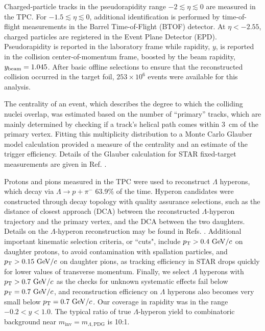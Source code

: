\documentclass[
  reprint,
  superscriptaddress,
  amsmath,
  amssymb,
  aps,
  floatfix,
]{revtex4-2}
\newcommand{\proton}{p}
\newcommand{\pion}{\pi^{-}}
\newcommand{\pT}{p_\mathrm{T}}
\newcommand{\InvMass}{m_\mathrm{inv}}
\newcommand{\LambdaPdgMass}{m_{\Lambda, \mathrm{PDG}}}
\begin{document}
Charged-particle tracks in the pseudorapidity range $-2\lesssim\eta\lesssim0$
 are measured in the TPC\cite{Anderson:2003ur}. For
 $-1.5\lesssim\eta\lesssim0$, additional identification is performed by
 time-of-flight measurements in the Barrel Time-of-Flight
 (BTOF) detector\cite{Llope:2012zz,Shao:2005iu}. At
 $\eta<-2.55$, charged particles are registered
 in the Event Plane Detector (EPD)\cite{Adams:2019fpo}.
 Pseudorapidity is reported 
 in the laboratory frame while rapidity, $y$, is reported in the
 collision center-of-momentum frame, boosted by the
 beam rapidity, $y_{\rm beam}=1.045$.
 After basic offline selections
 to ensure that the reconstructed collision
 occurred in the target foil, $253\times10^6$
 events were available for this analysis.

The centrality of an event, which
 describes the degree to which the
 colliding nuclei overlap, was estimated based
 on the number of ``primary'' tracks,
 which are mainly determined by checking
 if a track's helical path comes
 within 3~cm of the primary vertex.
 Fitting this multiplicity distribution to a
 Monte Carlo Glauber model\cite{Ray:2007av} calculation provided a
 measure of the centrality and an
 estimate of the trigger efficiency. Details
 of the Glauber calculation for STAR
 fixed-target measurements are given in Ref. \cite{STAR:2020dav}.

Protons and pions measured in the
 TPC were used to reconstruct $\Lambda$
 hyperons, which decay via $\Lambda\rightarrow \proton+\pion$
 63.9\% of the time\cite{Zyla:2020zbs}.  Hyperon
 candidates were constructed through decay topology
 with quality assurance selections, such as
 the distance of closest approach (DCA)
 between the reconstructed $\Lambda$-hyperon trajectory and
 the primary vertex, and the DCA
 between the two daughters.  Details
 on the $\Lambda$-hyperon reconstruction may be
 found in Refs. \cite{Adam:2018ivw,GorbunovThesis,MaksymThesis}.  Additional important kinematic
 selection criteria, or ``cuts", include $\pT>0.4~{\rm GeV}/c$ on daughter protons, to avoid
 contamination with spallation particles, and $\pT>0.15~{\rm GeV}/c$ on daughter pions, as tracking
 efficiency in STAR drops quickly for
 lower values of transverse momentum. 
 Finally, we select $\Lambda$ hyperons with
 $\pT>0.7~{\rm GeV}/c$ as the checks for
 unknown systematic effects fail below $\pT=0.7~{\rm GeV}/c$,
 and reconstruction efficiency on $\Lambda$ hyperons
 also becomes very small below $\pT=0.7~{\rm GeV}/c$. 
 Our coverage in rapidity
 was in the range $-0.2<y<1.0$.
 The typical ratio
 of true $\Lambda$-hyperon yield to combinatoric
 background near $\InvMass=\LambdaPdgMass$ is 10:1.
\end{document}
